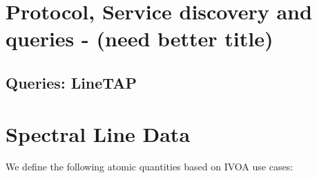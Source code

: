 \documentclass[11pt,a4paper]{ivoa}
\begin{document}
\section{Protocol, Service discovery and queries - (need better title)}

\subsection{ Queries: LineTAP }


\section{Spectral Line Data}\label{quantities}

We define the following atomic quantities based on IVOA use cases:
\end{document}
